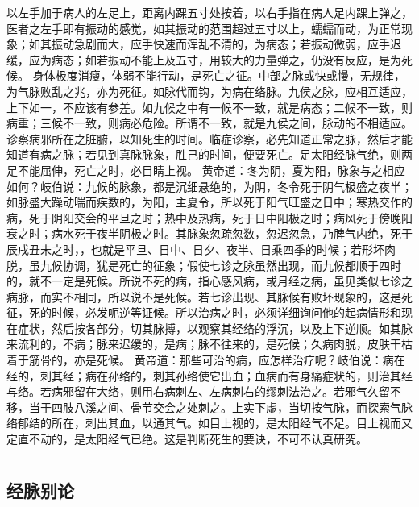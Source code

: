 \documentclass[a4paper,12pt,UTF8,twoside]{ctexbook}
\begin{document}
以左手加于病人的左足上，距离内踝五寸处按着，以右手指在病人足内踝上弹之，医者之左手即有振动的感觉，如其振动的范围超过五寸以上，蠕蠕而动，为正常现象；如其振动急剧而大，应手快速而浑乱不清的，为病态；若振动微弱，应手迟缓，应为病态；如若振动不能上及五寸，用较大的力量弹之，仍没有反应，是为死候。
身体极度消瘦，体弱不能行动，是死亡之征。中部之脉或快或慢，无规律，为气脉败乱之兆，亦为死征。如脉代而钩，为病在络脉。九侯之脉，应相互适应，上下如一，不应该有参差。如九候之中有一候不一致，就是病态；二候不一致，则病重；三候不一致，则病必危险。所谓不一致，就是九侯之间，脉动的不相适应。诊察病邪所在之脏腑，以知死生的时间。临症诊察，必先知道正常之脉，然后才能知道有病之脉；若见到真脉脉象，胜己的时间，便要死亡。足太阳经脉气绝，则两足不能屈伸，死亡之时，必目睛上视。
黄帝道：冬为阴，夏为阳，脉象与之相应如何？岐伯说：九候的脉象，都是沉细悬绝的，为阴，冬令死于阴气极盛之夜半；如脉盛大躁动喘而疾数的，为阳，主夏令，所以死于阳气旺盛之日中；寒热交作的病，死于阴阳交会的平旦之时；热中及热病，死于日中阳极之时；病风死于傍晚阳衰之时；病水死于夜半阴极之时。其脉象忽疏忽数，忽迟忽急，乃脾气内绝，死于辰戌丑未之时，，也就是平旦、日中、日夕、夜半、日乘四季的时候；若形坏肉脱，虽九候协调，犹是死亡的征象；假使七诊之脉虽然出现，而九候都顺于四时的，就不一定是死候。所说不死的病，指心感风病，或月经之病，虽见类似七诊之病脉，而实不相同，所以说不是死候。若七诊出现、其脉候有败坏现象的，这是死征，死的时候，必发呃逆等证候。所以治病之时，必须详细询问他的起病情形和现在症状，然后按各部分，切其脉搏，以观察其经络的浮沉，以及上下逆顺。如其脉来流利的，不病；脉来迟缓的，是病；脉不往来的，是死候；久病肉脱，皮肤干枯着于筋骨的，亦是死候。
黄帝道：那些可治的病，应怎样治疗呢？岐伯说：病在经的，刺其经；病在孙络的，刺其孙络使它出血；血病而有身痛症状的，则治其经与络。若病邪留在大络，则用右病刺左、左病刺右的缪刺法治之。若邪气久留不移，当于四肢八溪之间、骨节交会之处刺之。上实下虚，当切按气脉，而探索气脉络郁结的所在，刺出其血，以通其气。如目上视的，是太阳经气不足。目上视而又定直不动的，是太阳经气已绝。这是判断死生的要诀，不可不认真研究。

\part{}

\chapter{经脉别论}
\end{document}
